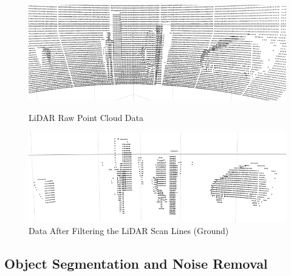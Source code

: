 \begin{figure}[!ht]
\centering
\begin{minipage}{0.49\textwidth}
  \centering
        \includegraphics[width=.9\linewidth]{images/ground_before2.png}
        \caption{LiDAR Raw Point Cloud Data}
        \label{fig:ground_before}
\end{minipage}%
\begin{minipage}{0.49\textwidth}
  \centering
        \includegraphics[width=.9\linewidth]{images/ground_after2.png}
        \caption{Data After Filtering the LiDAR Scan Lines (Ground)}
        \label{fig:after}
\end{minipage}%
\end{figure}





\subsection{Object Segmentation and Noise Removal}






